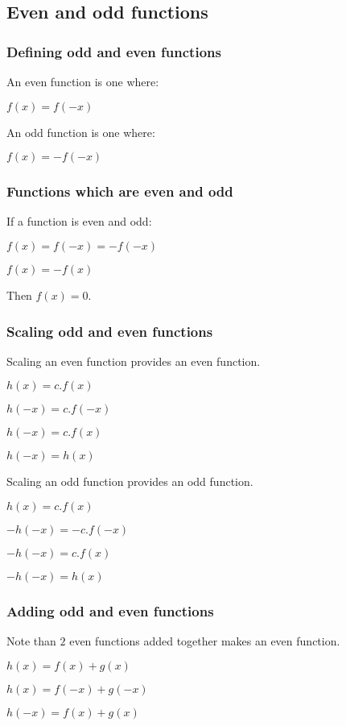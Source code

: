 
\subsection{Even and odd functions}

\subsubsection{Defining odd and even functions}

An even function is one where:

\(f(x)=f(-x)\)

An odd function is one where:

\(f(x)=-f(-x)\)

\subsubsection{Functions which are even and odd}

If a function is even and odd:

\(f(x)=f(-x)=-f(-x)\)

\(f(x)=-f(x)\)

Then \(f(x)=0\).
\subsubsection{Scaling odd and even functions}

Scaling an even function provides an even function.

\(h(x)=c.f(x)\)

\(h(-x)=c.f(-x)\)

\(h(-x)=c.f(x)\)

\(h(-x)=h(x)\)

Scaling an odd function provides an odd function.

\(h(x)=c.f(x)\)

\(-h(-x)=-c.f(-x)\)

\(-h(-x)=c.f(x)\)

\(-h(-x)=h(x)\)

\subsubsection{Adding odd and even functions}

Note than \(2\) even functions added together makes an even function.

\(h(x)=f(x)+g(x)\)

\(h(x)=f(-x)+g(-x)\)

\(h(-x)=f(x)+g(x)\)

